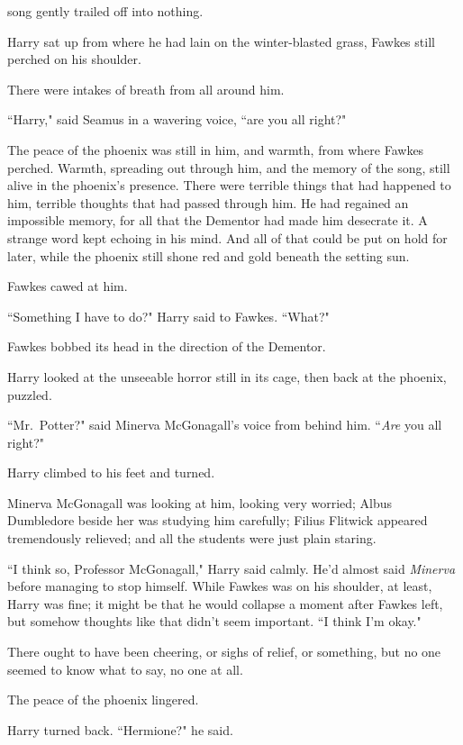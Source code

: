 
 song gently trailed off into nothing.

\hplettrineextrapara
Harry sat up from where he had lain on the winter-blasted grass, Fawkes still perched on his shoulder.

There were intakes of breath from all around him.

``Harry," said Seamus in a wavering voice, ``are you all right?"

The peace of the phoenix was still in him, and warmth, from where Fawkes perched. Warmth, spreading out through him, and the memory of the song, still alive in the phoenix's presence. There were terrible things that had happened to him, terrible thoughts that had passed through him. He had regained an impossible memory, for all that the Dementor had made him desecrate it. A strange word kept echoing in his mind. And all of that could be put on hold for later, while the phoenix still shone red and gold beneath the setting sun.

Fawkes cawed at him.

``Something I have to do?" Harry said to Fawkes. ``What?"

Fawkes bobbed its head in the direction of the Dementor.

Harry looked at the unseeable horror still in its cage, then back at the phoenix, puzzled.

``Mr.~Potter?" said Minerva McGonagall's voice from behind him. ``\emph{Are} you all right?"

Harry climbed to his feet and turned.

Minerva McGonagall was looking at him, looking very worried; Albus Dumbledore beside her was studying him carefully; Filius Flitwick appeared tremendously relieved; and all the students were just plain staring.

``I think so, Professor McGonagall," Harry said calmly. He'd almost said \emph{Minerva} before managing to stop himself. While Fawkes was on his shoulder, at least, Harry was fine; it might be that he would collapse a moment after Fawkes left, but somehow thoughts like that didn't seem important. ``I think I'm okay."

There ought to have been cheering, or sighs of relief, or something, but no one seemed to know what to say, no one at all.

The peace of the phoenix lingered.

Harry turned back. ``Hermione?" he said.

